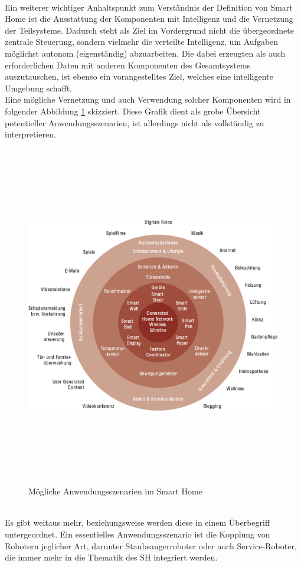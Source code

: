         \\
        Ein weiterer wichtiger Anhaltspunkt zum Verständnis der Definition von Smart Home ist die Ausstattung der Komponenten mit Intelligenz und die 
        Vernetzung der Teilsysteme. Dadurch steht als Ziel im Vordergrund nicht die übergeordnete zentrale Steuerung, sondern vielmehr die verteilte 
        Intelligenz, um Aufgaben möglichst autonom (eigenständig) abzuarbeiten. Die dabei erzeugten als auch erforderlichen Daten mit anderen 
        Komponenten des Gesamtsystems auszutauschen, ist ebenso ein vorangestelltes Ziel, welches eine intelligente Umgebung schafft. 
        \\
        Eine mögliche Vernetzung und auch Verwendung solcher Komponenten wird in folgender Abbildung \ref{pic:szenarien-smarhome} 
        skizziert. Diese Grafik dient als grobe Übersicht potentieller Anwendungsszenarien, ist allerdings nicht als vollständig zu interpretieren. 
        \begin{figure}[hbt!]
            \centering
            \includegraphics[width=15cm,height=15cm,keepaspectratio]{images/Anwendungsszenarien_SH.png}
            \caption{Mögliche Anwendungsszenarien im Smart Home \cite{strese.2010m}}
            \label{pic:szenarien-smarhome}
        \end{figure}
        \\
        Es gibt weitaus mehr, beziehungsweise werden diese in einem Überbegriff untergeordnet. Ein essentielles Anwendungsszenario ist die Kopplung 
        von Robotern jeglicher Art, darunter Staubsaugerroboter oder auch Service-Roboter, die immer mehr in die Thematik des \acl{SH} integriert werden. 
        
